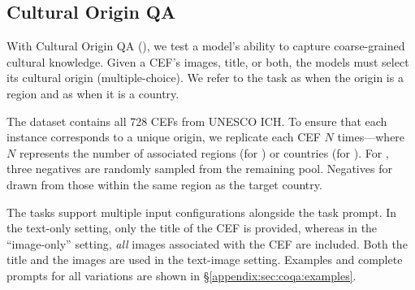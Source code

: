 \subsection{Cultural Origin QA}
\label{sec:coqa}
%
With Cultural Origin QA (\coqa), we test a model's ability to capture coarse-grained cultural knowledge.
%
Given a CEF's images, title, or both, the models must select its cultural origin (multiple-choice).
%
We refer to the task as \coqar when the origin is a region and as \coqac when it is a country.
%

\label{sec:coqa:collection}
%
The \coqa dataset contains all 728 CEFs from UNESCO ICH.
%
To ensure that each instance corresponds to a unique origin, we replicate each CEF $N$ times—where $N$ represents the number of associated regions (for \coqar) or countries (for \coqac).
%
For \coqar, three negatives are randomly sampled from the remaining pool.
%
%
Negatives for \coqac drawn from those within the same region as the target country.
%

\label{sec:coqa:config}
%
The \coqa tasks support multiple input configurations alongside the task prompt.
%
In the text-only setting, only the title of the CEF is provided, whereas in the ``image-only'' setting, \emph{all} images associated with the CEF are included.
%
Both the title and the images are used in the text-image setting.
%
Examples and complete prompts for all variations are shown in \S\ref{appendix:sec:coqa:examples}.
%

